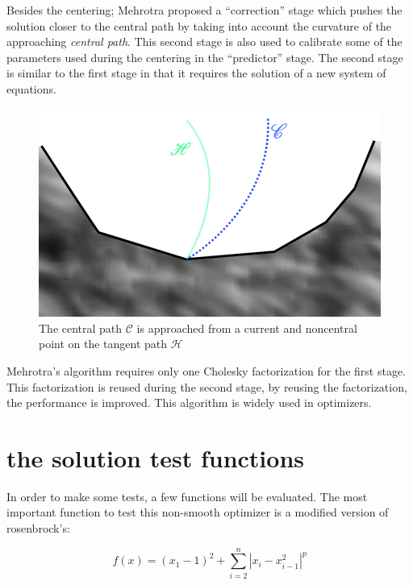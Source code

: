Besides the centering; Mehrotra proposed a ``correction'' stage which pushes the solution closer to the central path by taking into account the curvature of the approaching \emph{central path}. This second stage is also used to calibrate some of the parameters used during the centering in the ``predictor'' stage. The second stage is similar to the first stage in that it requires the solution of a new system of equations.

\begin{figure}
\begin{center}
\includegraphics[scale=0.3]{Figures/CentralPath.png}
\caption{The central path $\mathcal{C}$ is approached from a current and noncentral point on the tangent path $\mathcal{H}$}
\end{center}
\end{figure}

Mehrotra's algorithm requires only one Cholesky factorization for the first stage. This factorization is reused during the second stage, by reusing the factorization, the performance is improved.  This algorithm is widely used in optimizers.

\chapter{the solution test functions}

In order to make some tests, a few functions will be evaluated. The most important function to test this non-smooth optimizer is a modified version of rosenbrock's:

\begin{equation}
    f(x) = (x_1 - 1)^2 + \sum_{i = 2}^n |x_i - x_{i - 1}^2|^p
\end{equation}

